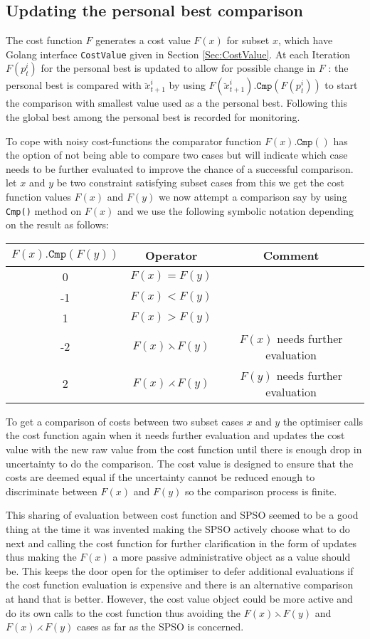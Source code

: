 \documentclass[a4paper,oneside,english]{book}
\numberwithin{equation}{section}
\numberwithin{figure}{section}
\begin{document}
\subsection{Updating the personal best comparison}
The cost function $F$ generates a cost value $F(x)$ for subset $x$, which have Golang interface \texttt{CostValue} given in Section \ref{Sec:CostValue}. At each Iteration $F(p^i_t)$ for the personal best is updated to allow for possible change in $F$ : the personal best is compared with $\breve{x}_{t+1}^i$ by using $F(\breve{x}_{t+1}^i).\mathtt{Cmp}(F(p^i_t))$ to start the comparison with smallest value used as a the personal best. Following this the global best among the personal best is recorded for monitoring.

To cope with noisy cost-functions the comparator function $F(x).\mathtt{Cmp()}$ has the option of not being able to compare two  cases but will indicate which case needs to be further evaluated to improve the chance of a successful  comparison. let $x$  and $y$ be two constraint satisfying subset cases from this we get the cost function values $F(x)$ and $F(y)$ we now attempt a comparison say by using \texttt{Cmp()} method on $F(x)$ and we use the  following symbolic notation depending on the result as follows:

\begin{tabular}{|c|c|c|}\hline
$F(x).\mathtt{Cmp}(F(y))$ & Operator& Comment\\
\hline \hline 
0& $F(x)=F(y)$& \\
-1& $F(x)<F(y)$ &\\
1&$F(x)>F(y)$ &\\
-2&$F(x)\leftthreetimes F(y)$& $F(x)$ needs further evaluation\\
2&$F(x)\rightthreetimes F(y)$& $F(y)$ needs further evaluation\\
\hline	
	
\end{tabular}\newline
To get a comparison of costs between two subset cases $x$ and $y$  the optimiser  calls the cost function again when it needs  further evaluation and updates the cost  value with the new raw  value  from the cost function until there is enough drop in uncertainty to do the comparison. The cost value is designed to ensure  that the costs are deemed equal if the uncertainty cannot be reduced enough to discriminate between $F(x)$ and $F(y)$  so the comparison process is finite. 

This sharing of evaluation between cost function and SPSO seemed to be a good thing at the time it was invented making the SPSO actively choose what to do next and calling the cost function for further clarification in the form of updates thus making the $F(x)$ a more passive administrative object as a value should be. This keeps the door open for the optimiser to defer additional evaluations if the cost function evaluation is expensive and there is an alternative comparison at hand that is better. However, the cost value object could be more active and do its own calls to the cost function thus avoiding the $F(x)\leftthreetimes F(y)$ and  $F(x)\rightthreetimes F(y)$ cases as far as the SPSO is concerned.
\end{document}
